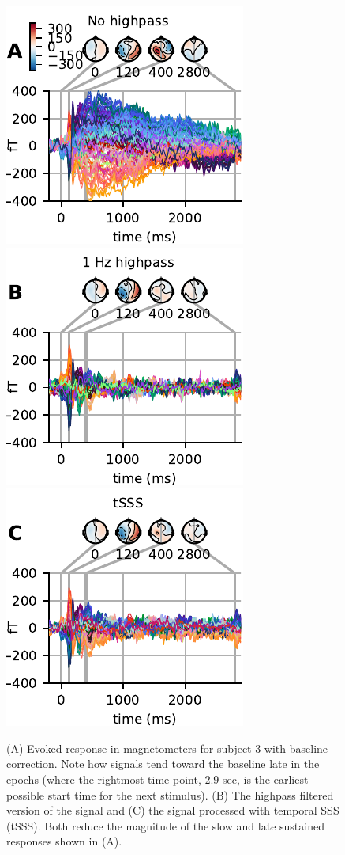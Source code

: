 \begin{figure}[t]
  \centering
  \includegraphics{figures/FanningA.pdf}
  \hspace{1em}
  \includegraphics{figures/FanningB.pdf}
  \hspace{1em}
  \includegraphics{figures/FanningC.pdf}
  \vspace{-10pt}
\caption[Comparison of highpass filtering and tSSS on evoked response.]{(A) Evoked response in magnetometers for subject 3 with baseline correction. Note how signals tend toward the baseline late in the epochs (where the rightmost time point, 2.9 sec, is the earliest possible start time for the next stimulus). (B) The highpass filtered version of the signal and (C) the signal processed with temporal SSS (tSSS). Both reduce the magnitude of the slow and late sustained responses shown in (A).}
\label{fig:fanning}
\end{figure}
  
